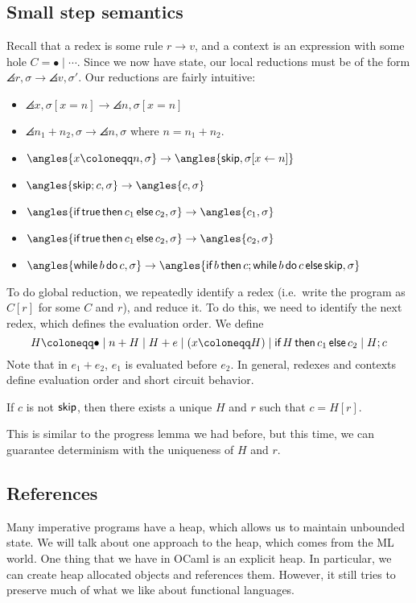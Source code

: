 \documentclass[class=scrartcl]{standalone}
\begin{document}
\subsection{Small step semantics}
Recall that a redex is some rule \(r \to v\),
and a context is an expression with some hole \(C = \bullet \mid \cdots\).
Since we now have state, our local reductions must be of the form
\(\angles{r, \sigma} \to \angles{v, \sigma'}\).
Our reductions are fairly intuitive:
\begin{itemize}
  \item \(\angles{x, \sigma[x = n]} \to \angles{n, \sigma[x = n]}\)
  \item \(\angles{n_1 + n_2, \sigma} \to \angles{n, \sigma}\)
        where \(n = n_1 + n_2\).
  \item \(\angles{x \coloneqq n, \sigma} \to \angles{\pskip, \sigma[x \gets n]}\)
  \item \(\angles{\pskip; c, \sigma} \to \angles{c, \sigma}\)
  \item \(\angles{\pifthenelse{\ptrue}{c_1}{c_2}, \sigma}
          \to \angles{c_1, \sigma}\)
  \item \(\angles{\pifthenelse{\ptrue}{c_1}{c_2}, \sigma}
          \to \angles{c_2, \sigma}\)
  \item \(\angles{\pwhiledo{b}{c}, \sigma}
          \to \angles{\pifthenelse{b}{c; \pwhiledo{b}{c}}{\pskip}, \sigma}\)
\end{itemize}
To do global reduction, we repeatedly identify a redex
(i.e.\ write the program as \(C[r]\) for some \(C\) and \(r\)), and reduce it.
To do this, we need to identify the next redex,
which defines the evaluation order.
We define
\[
  H \coloneqq \bullet
         \mid n + H
         \mid H + e
         \mid (x \coloneqq H)
         \mid \pifthenelse{H}{c_1}{c_2}
         \mid H; c
\]
Note that in \(e_1 + e_2\), \(e_1\) is evaluated before \(e_2\).
In general, redexes and contexts define
evaluation order and short circuit behavior.

\begin{lemma}[Decomposition]
  If \(c\) is not \(\textsf{skip}\), then there exists a unique \(H\) and \(r\)
  such that \(c = H[r]\).
\end{lemma}
This is similar to the progress lemma we had before,
but this time, we can guarantee determinism
with the uniqueness of \(H\) and \(r\).


\subsection{References}
Many imperative programs have a heap,
which allows us to maintain unbounded state.
We will talk about one approach to the heap,
which comes from the ML world.
One thing that we have in OCaml is an explicit heap.
In particular, we can create heap allocated objects and references them.
However, it still tries to preserve much of what we like
about functional languages.
\end{document}
